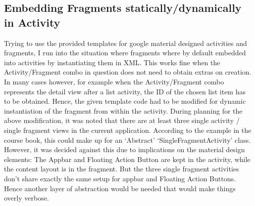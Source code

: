 \documentclass[a4paper,11pt,twoside]{article}
\begin{document}
\subsection{Embedding Fragments statically/dynamically in Activity}
Trying to use the provided templates for google material designed activities and
fragments, I run into the situation where fragments where by default embedded into
activities by instantiating them in XML. This works fine when the Activity/Fragment
combo in question does not need to obtain extras on creation. In many cases however,
for example when the Activity/Fragment combo represents the detail view after a
list activity, the ID of the chosen list item has to be obtained. Hence, the given
template code had to be modified for dynamic instantiation of the fragment from
within the activity.
During planning for the above modification, it was noted that there are at least
three single activity / single fragment views in the current application. According
to the example in the course book, this could make up for an `Abstract'
`SingleFragmentActivity' class. However, it was decided against this due to
implications on the material design elements: The Appbar and Floating Action Button
are kept in the activity, while the content layout is in the fragment. But the
three single fragment activities don't share exactly the same setup for appbar
and Floating Action Buttons. Hence another layer of abstraction would be needed that
would make things overly verbose.





\end{document}
